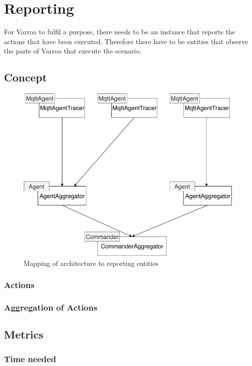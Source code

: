 \chapter{Reporting}
For Varroa to fulfil a purpose, there needs to be an instance that reports the actions that have been executed.
Therefore there have to be entities that observe the parts of Varroa that execute the scenario.

\section{Concept}
\begin{figure}[H]
	\begin{center}
		\includegraphics[scale=0.8]{Resources/PDF/ReportMapping}
		\caption{Mapping of architecture to reporting entities}
		\label{fig:ReportMapping}
	\end{center}
\end{figure}



\subsection{Actions}

\subsection{Aggregation of Actions}

\section{Metrics}

\subsection{Time needed}



